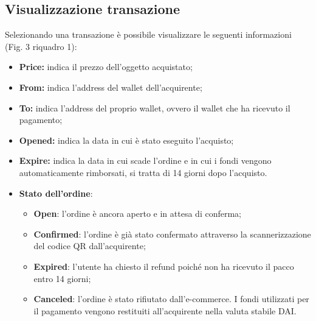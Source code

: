 \documentclass[a4paper, 12pt]{article}
\begin{document}
\subsection{Visualizzazione transazione}
Selezionando una transazione è possibile visualizzare le seguenti informazioni (Fig. 3 riquadro 1):
\begin{itemize}
  \item \textbf{Price:} indica il prezzo dell'oggetto acquistato;
  \item \textbf{From:} indica l'address del wallet dell'acquirente;
  \item \textbf{To:} indica l'address del proprio wallet, ovvero il wallet che ha ricevuto il pagamento;
  \item \textbf{Opened:} indica la data in cui è stato eseguito l'acquisto;
  \item \textbf{Expire:} indica la data in cui scade l'ordine e in cui i fondi vengono automaticamente rimborsati, si tratta di 14 giorni dopo l'acquisto.
  \item \textbf{Stato dell'ordine}:
  \begin{itemize}
    \item \textbf{Open}: l'ordine è ancora aperto e in attesa di conferma;
    \item \textbf{Confirmed}: l'ordine è già stato confermato attraverso la scannerizzazione del codice QR dall'acquirente;
    \item \textbf{Expired}: l'utente ha chiesto il refund poiché non ha ricevuto il pacco entro 14 giorni;
    \item \textbf{Canceled}: l'ordine è stato rifiutato dall'e-commerce. I fondi utilizzati per il pagamento vengono restituiti all'acquirente nella valuta stabile DAI.
  \end{itemize}
\end{itemize}
\end{document}
